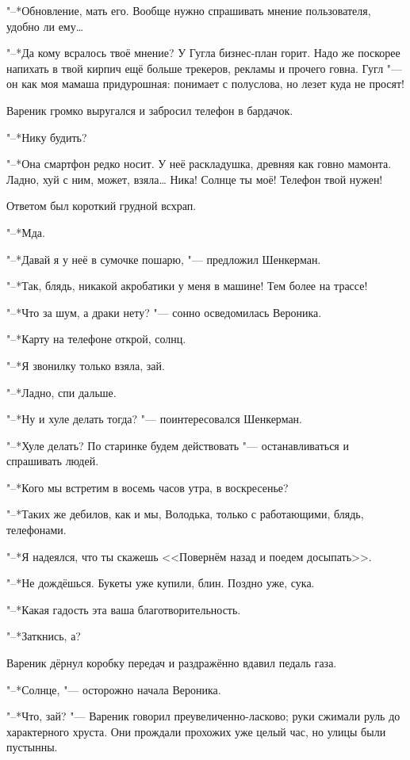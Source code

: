 "--*Обновление, мать его.
Вообще нужно спрашивать мнение пользователя, удобно ли ему\ldots{}

"--*Да кому всралось твоё мнение?
У Гугла бизнес-план горит.
Надо же поскорее напихать в твой кирпич ещё больше трекеров, рекламы и прочего говна.
Гугл "--- он как моя мамаша придурошная: понимает с полуслова, но лезет куда не просят!

Вареник громко выругался и забросил телефон в бардачок.

"--*Нику будить?

"--*Она смартфон редко носит.
У неё раскладушка, древняя как говно мамонта.
Ладно, хуй с ним, может, взяла\ldots{}
Ника!
Солнце ты моё!
Телефон твой нужен!

Ответом был короткий грудной всхрап.

"--*Мда.

"--*Давай я у неё в сумочке пошарю, "--- предложил Шенкерман.

"--*Так, блядь, никакой акробатики у меня в машине!
Тем более на трассе!

"--*Что за шум, а драки нету? "--- сонно осведомилась Вероника.

"--*Карту на телефоне открой, солнц.

"--*Я звонилку только взяла, зай.

"--*Ладно, спи дальше.

"--*Ну и хуле делать тогда? "--- поинтересовался Шенкерман.

"--*Хуле делать?
По старинке будем действовать "--- останавливаться и спрашивать людей.

"--*Кого мы встретим в восемь часов утра, в воскресенье?

"--*Таких же дебилов, как и мы, Володька, только с работающими, блядь, телефонами.

"--*Я надеялся, что ты скажешь <<Повернём назад и поедем досыпать>>.

"--*Не дождёшься.
Букеты уже купили, блин.
Поздно уже, сука.

"--*Какая гадость эта ваша благотворительность.

"--*Заткнись, а?

Вареник дёрнул коробку передач и раздражённо вдавил педаль газа.

\asterism

\textspace

"--*Солнце, "--- осторожно начала Вероника.

"--*Что, зай? "--- Вареник говорил преувеличенно-ласково;
руки сжимали руль до характерного хруста.
Они прождали прохожих уже целый час, но улицы были пустынны.

